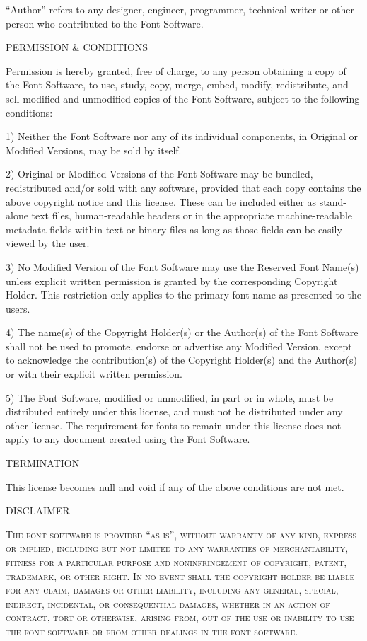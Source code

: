 \documentclass[12pt, english]{article}
\begin{document}
\begin{raggedright}
``Author'' refers to any designer, engineer, programmer, technical
writer or other person who contributed to the Font Software.


PERMISSION \& CONDITIONS

Permission is hereby granted, free of charge, to any person obtaining
a copy of the Font Software, to use, study, copy, merge, embed, modify,
redistribute, and sell modified and unmodified copies of the Font
Software, subject to the following conditions:

1) Neither the Font Software nor any of its individual components,
in Original or Modified Versions, may be sold by itself.

2) Original or Modified Versions of the Font Software may be bundled,
redistributed and/or sold with any software, provided that each copy
contains the above copyright notice and this license. These can be
included either as stand-alone text files, human-readable headers or
in the appropriate machine-readable metadata fields within text or
binary files as long as those fields can be easily viewed by the user.

3) No Modified Version of the Font Software may use the Reserved Font
Name(s) unless explicit written permission is granted by the corresponding
Copyright Holder. This restriction only applies to the primary font name as
presented to the users.

4) The name(s) of the Copyright Holder(s) or the Author(s) of the Font
Software shall not be used to promote, endorse or advertise any
Modified Version, except to acknowledge the contribution(s) of the
Copyright Holder(s) and the Author(s) or with their explicit written
permission.

5) The Font Software, modified or unmodified, in part or in whole,
must be distributed entirely under this license, and must not be
distributed under any other license. The requirement for fonts to
remain under this license does not apply to any document created
using the Font Software.


TERMINATION

This license becomes null and void if any of the above conditions are
not met.


DISCLAIMER

\textsc{The font software is provided ``as is'', without warranty of any kind,
express or implied, including but not limited to any warranties of
merchantability, fitness for a particular purpose and noninfringement
of copyright, patent, trademark, or other right. In no event shall the
copyright holder be liable for any claim, damages or other liability,
including any general, special, indirect, incidental, or consequential
damages, whether in an action of contract, tort or otherwise, arising
from, out of the use or inability to use the font software or from
other dealings in the font software.}



\end{raggedright}
\end{document}
